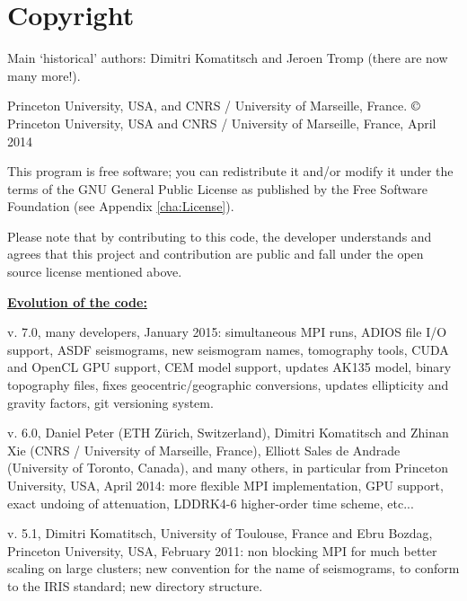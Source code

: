 \chapter*{Copyright}\label{cha:Copyright}

Main `historical' authors: Dimitri Komatitsch and Jeroen Tromp (there are now many more!).

Princeton University, USA, and CNRS / University of Marseille, France.\newline
$\copyright$ Princeton University, USA and CNRS / University of Marseille, France, April 2014\newline

\noindent
This program is free software; you can redistribute it and/or modify
it under the terms of the GNU General Public License as published
by the Free Software Foundation (see Appendix \ref{cha:License}).\newline

\noindent
Please note that by contributing to this code, the developer understands and agrees that this project and contribution
are public and fall under the open source license mentioned above.\newline

\noindent
\textbf{\underline{Evolution of the code:}}\newline

 v. 7.0, many developers, January 2015:
     simultaneous MPI runs, ADIOS file I/O support, ASDF seismograms, new seismogram names, tomography tools,
     CUDA and OpenCL GPU support, CEM model support, updates AK135 model, binary topography files,
     fixes geocentric/geographic conversions, updates ellipticity and gravity factors, git versioning system.\newline

 v. 6.0, Daniel Peter (ETH Z\"urich, Switzerland), Dimitri Komatitsch and Zhinan Xie (CNRS / University of Marseille, France),
     Elliott Sales de Andrade (University of Toronto, Canada), and many others, in particular from Princeton University, USA,
     April 2014:
     more flexible MPI implementation, GPU support, exact undoing of attenuation, LDDRK4-6 higher-order time scheme, etc...\newline

 v. 5.1, Dimitri Komatitsch, University of Toulouse, France and Ebru Bozdag, Princeton University, USA, February 2011:
     non blocking MPI for much better scaling on large clusters;
     new convention for the name of seismograms, to conform to the IRIS standard;
     new directory structure.\newline

